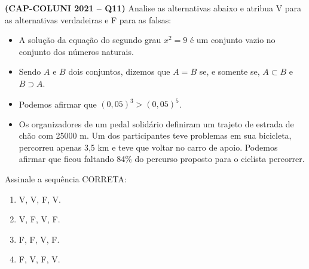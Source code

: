 \textbf{(CAP-COLUNI 2021 -- Q11)} Analise as alternativas abaixo e atribua V para as alternativas verdadeiras e F para as falsas:
\begin{itemize}
\item[(\ \ )] A solução da equação do segundo grau $x^2=9$ é um conjunto vazio no conjunto dos números naturais.
\item[(\ \ )] Sendo $A$ e $B$ dois conjuntos, dizemos que $A=B$ se, e somente se, $A\subset B$ e $B\supset A$.
\item[(\ \ )] Podemos afirmar que $(0{,}05)^3>(0{,}05)^5$.
\item[(\ \ )] Os organizadores de um pedal solidário definiram um trajeto de estrada de chão com 25000 m. Um dos participantes teve problemas em sua bicicleta, percorreu apenas 3,5 km e teve que voltar no carro de apoio. Podemos afirmar que ficou faltando 84\% do percurso proposto para o ciclista percorrer.
\end{itemize}

Assinale a sequência CORRETA:

\begin{enumerate}
	\item V, V, F, V.
	\item V, F, V, F.
	\item F, F, V, F.
	\item F, V, F, V.
\end{enumerate}
